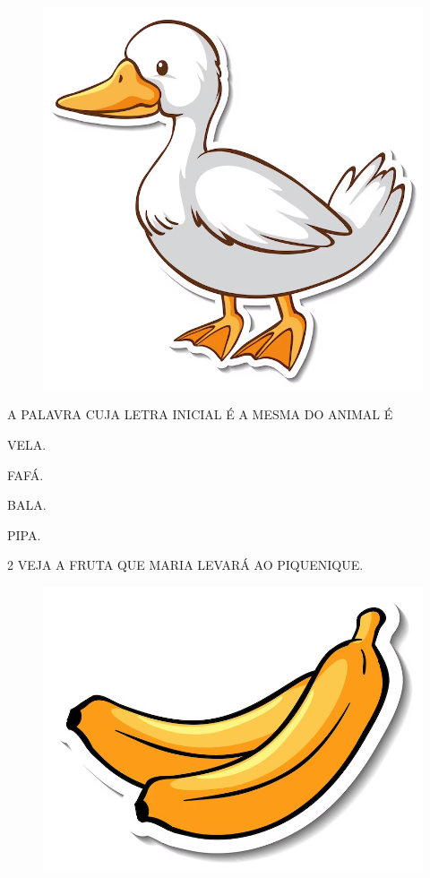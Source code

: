 \begin{figure}[H]
\centering
\includegraphics[width=.8\textwidth]{./media/image238.png}
\end{figure}

A PALAVRA CUJA LETRA INICIAL É A MESMA DO ANIMAL É

\begin{escolha}

\item VELA.

\item FAFÁ.

\item BALA.

\item PIPA.

\end{escolha}

\pagebreak
\num{2} VEJA A FRUTA QUE MARIA LEVARÁ AO PIQUENIQUE.

\begin{figure}[H]
\centering
\includegraphics[width=.75\textwidth]{./media/image72.png}
\end{figure}

